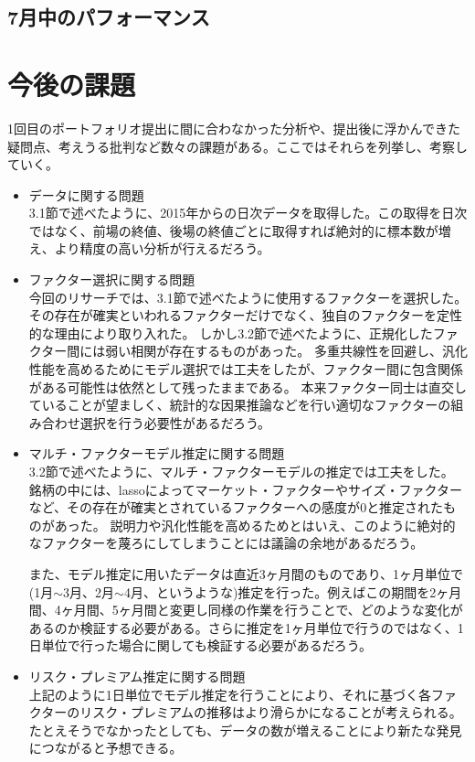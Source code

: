 \documentclass[11pt]{jreport}
\begin{document}
\section{7月中のパフォーマンス}
\chapter{今後の課題}
1回目のポートフォリオ提出に間に合わなかった分析や、提出後に浮かんできた疑問点、考えうる批判など数々の課題がある。ここではそれらを列挙し、考察していく。

\begin{itemize}
\item{データに関する問題}\\
\quad 3.1節で述べたように、2015年からの日次データを取得した。この取得を日次ではなく、前場の終値、後場の終値ごとに取得すれば絶対的に標本数が増え、より精度の高い分析が行えるだろう。
\item{ファクター選択に関する問題}\\
\quad 今回のリサーチでは、3.1節で述べたように使用するファクターを選択した。
その存在が確実といわれるファクターだけでなく、独自のファクターを定性的な理由により取り入れた。
しかし3.2節で述べたように、正規化したファクター間には弱い相関が存在するものがあった。
多重共線性を回避し、汎化性能を高めるためにモデル選択では工夫をしたが、ファクター間に包含関係がある可能性は依然として残ったままである。
本来ファクター同士は直交していることが望ましく、統計的な因果推論などを行い適切なファクターの組み合わせ選択を行う必要性があるだろう。

\item{マルチ・ファクターモデル推定に関する問題}\\
\quad 3.2節で述べたように、マルチ・ファクターモデルの推定では工夫をした。
銘柄の中には、lassoによってマーケット・ファクターやサイズ・ファクターなど、その存在が確実とされているファクターへの感度が$0$と推定されたものがあった。
説明力や汎化性能を高めるためとはいえ、このように絶対的なファクターを蔑ろにしてしまうことには議論の余地があるだろう。

\quad また、モデル推定に用いたデータは直近3ヶ月間のものであり、1ヶ月単位で(1月$\sim$3月、2月$\sim$4月、というような)推定を行った。例えばこの期間を2ヶ月間、4ヶ月間、5ヶ月間と変更し同様の作業を行うことで、どのような変化があるのか検証する必要がある。さらに推定を1ヶ月単位で行うのではなく、1日単位で行った場合に関しても検証する必要があるだろう。
\item{リスク・プレミアム推定に関する問題}\\
\quad 上記のように1日単位でモデル推定を行うことにより、それに基づく各ファクターのリスク・プレミアムの推移はより滑らかになることが考えられる。
たとえそうでなかったとしても、データの数が増えることにより新たな発見につながると予想できる。


\end{itemize}
\end{document}
